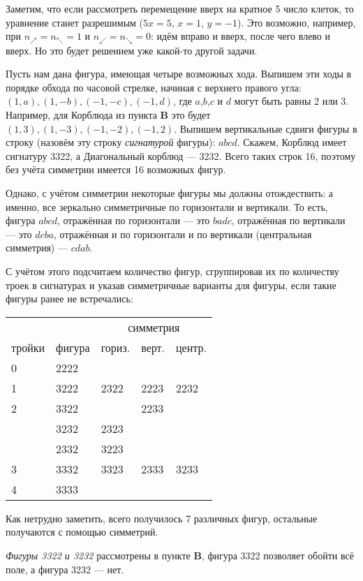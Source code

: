 \begin{itemize}
Заметим, что если рассмотреть перемещение вверх на кратное 5 число клеток, то 
уравнение станет разрешимым ($5x = 5$, $x=1$, $y=-1$). Это возможно, например,
при $n_\nearrow = n_\nwarrow = 1$ и $n_\swarrow = n_\searrow = 0$: идём вправо и вверх,
после чего влево и вверх. Но это будет решением уже какой-то другой задачи.

\itC Пусть нам дана фигура, имеющая четыре возможных хода. Выпишем эти ходы
в порядке обхода по часовой стрелке, начиная с верхнего правого угла:
$(1,a),(1,-b),(-1,-c),(-1,d)$, где $a$,$b$,$c$ и $d$ могут быть равны 2 или 3. 
Например, для Корблюда из пункта {\bfseries B} это будет $(1,3),(1,-3),(-1,-2),(-1,2)$.
Выпишем вертикальные сдвиги фигуры в строку (назовём эту строку \emph{сигнатурой} фигуры):
$abcd$. Скажем, Корблюд имеет сигнатуру 3322, а Диагональный корблюд --- 3232. 
Всего таких строк 16, поэтому без учёта симметрии имеется 16 возможных фигур.

Однако, с учётом симметрии некоторые фигуры мы должны отождествить: а именно, все зеркально
симметричные по горизонтали и вертикали. То есть, фигура $abcd$, отражённая по горизонтали --- 
это $badc$, отражённая по вертикали --- это $dcba$, отражённая и по горизонтали и по 
вертикали (центральная симметрия) --- $cdab$.

С учётом этого подсчитаем количество фигур, сгруппировав их по количеству троек в сигнатурах
и указав симметричные варианты для фигуры, если такие фигуры ранее не встречались:

\begin{center}\begin{tabular}{lllll}
       &        & \multicolumn{3}{c}{симметрия}\\\cline{3-5}
тройки & фигура & гориз. & верт. & центр.\\
\hline
0 & 2222                       \\
1 & 3222 & 2322 & 2223 & 2232\\
2 & 3322 &      & 2233 & \\
  & 3232 & 2323 & & \\
  & 2332 & 3223 & & \\
3 & 3332 & 3323 & 2333 & 3233 \\
4 & 3333 & 
\end{tabular}\end{center}

Как нетрудно заметить, всего получилось 7 различных фигур, остальные получаются с помощью симметрий.

\emph{Фигуры 3322 и 3232} рассмотрены в пункте {\bfseries B}, фигура 3322 позволяет обойти всё поле, а 
фигура 3232 --- нет. 


\end{itemize}
